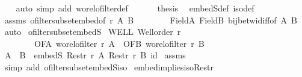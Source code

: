 \begin{isabellebody}
\ \ \isamarkupfalse%
\ {\isacharparenleft}{\kern0pt}auto\ simp\ add{\isacharcolon}{\kern0pt}\ wo{\isacharunderscore}{\kern0pt}rel{\isachardot}{\kern0pt}ofilter{\isacharunderscore}{\kern0pt}def{\isacharparenright}{\kern0pt}\isanewline
\ \ \isanewline
\ \ \isamarkupfalse%
\ {\isacharquery}{\kern0pt}thesis\ \isamarkupfalse%
\ embedS{\isacharunderscore}{\kern0pt}def\ iso{\isacharunderscore}{\kern0pt}def\isanewline
\ \ \isamarkupfalse%
\ assms\ ofilter{\isacharunderscore}{\kern0pt}subset{\isacharunderscore}{\kern0pt}embed{\isacharbrackleft}{\kern0pt}of\ r\ A\ B{\isacharbrackright}{\kern0pt}\isanewline
\ \ \ \ \ \ \ \ FieldA\ FieldB\ bij{\isacharunderscore}{\kern0pt}betw{\isacharunderscore}{\kern0pt}id{\isacharunderscore}{\kern0pt}iff{\isacharbrackleft}{\kern0pt}of\ A\ B{\isacharbrackright}{\kern0pt}\ \isamarkupfalse%
\ auto\isanewline
{}\isamarkupfalse%
%
\endisatagproof
{\isafoldproof}%
%
\isadelimproof
\isanewline
%
\endisadelimproof
\isanewline
{}\isamarkupfalse%
\ ofilter{\isacharunderscore}{\kern0pt}subset{\isacharunderscore}{\kern0pt}embedS{\isacharcolon}{\kern0pt}\isanewline
{}\ WELL{\isacharcolon}{\kern0pt}\ {\isachardoublequoteopen}Well{\isacharunderscore}{\kern0pt}order\ r{\isachardoublequoteclose}\ \isanewline
\ \ \ \ \ \ \ \ OFA{\isacharcolon}{\kern0pt}\ {\isachardoublequoteopen}wo{\isacharunderscore}{\kern0pt}rel{\isachardot}{\kern0pt}ofilter\ r\ A{\isachardoublequoteclose}\ \ OFB{\isacharcolon}{\kern0pt}\ {\isachardoublequoteopen}wo{\isacharunderscore}{\kern0pt}rel{\isachardot}{\kern0pt}ofilter\ r\ B{\isachardoublequoteclose}\isanewline
{}\ {\isachardoublequoteopen}{\isacharparenleft}{\kern0pt}A\ {\isacharless}{\kern0pt}\ B{\isacharparenright}{\kern0pt}\ {\isacharequal}{\kern0pt}\ embedS\ {\isacharparenleft}{\kern0pt}Restr\ r\ A{\isacharparenright}{\kern0pt}\ {\isacharparenleft}{\kern0pt}Restr\ r\ B{\isacharparenright}{\kern0pt}\ id{\isachardoublequoteclose}\isanewline
%
\isadelimproof
%
\endisadelimproof
%
\isatagproof
{}\isamarkupfalse%
\ assms\ \isamarkupfalse%
\ {\isacharparenleft}{\kern0pt}simp\ add{\isacharcolon}{\kern0pt}\ ofilter{\isacharunderscore}{\kern0pt}subset{\isacharunderscore}{\kern0pt}embedS{\isacharunderscore}{\kern0pt}iso{\isacharparenright}{\kern0pt}%
\endisatagproof
{\isafoldproof}%
%
\isadelimproof
\isanewline
%
\endisadelimproof
\isanewline
{}\isamarkupfalse%
\ embed{\isacharunderscore}{\kern0pt}implies{\isacharunderscore}{\kern0pt}iso{\isacharunderscore}{\kern0pt}Restr{\isacharcolon}{\kern0pt}\isanewline

\end{isabellebody}
